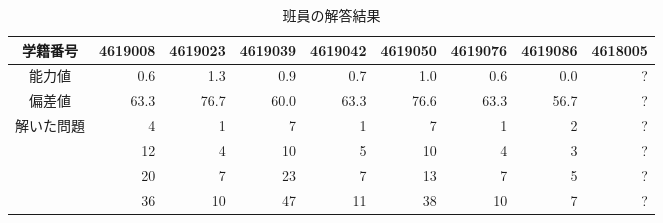 \documentclass[12pt]{jarticle}
\begin{document}
\begin{table}[h]
    \begin{center}
        \centering
        \caption{班員の解答結果}
        \begin{tabular}{|c|r|r|r|r|r|r|r|r|} \hline
            学籍番号                     & \multicolumn{1}{|c|}{4619008} & \multicolumn{1}{|c|}{4619023} & \multicolumn{1}{|c|}{4619039} & \multicolumn{1}{|c|}{4619042} & \multicolumn{1}{|c|}{4619050} & \multicolumn{1}{|c|}{4619076} & \multicolumn{1}{|c|}{4619086} & \multicolumn{1}{|c|}{4618005} \\
            \hline
            能力値                       & 0.6                           & 1.3                           & 0.9                           & 0.7                           & 1.0                           & 0.6                           & 0.0                           & ?                             \\ \hline
            偏差値                       & 63.3                          & 76.7                          & 60.0                          & 63.3                          & 76.6                          & 63.3                          & 56.7                          & ?                             \\ \hline
            \multirow{20}{*}{解いた問題} & 4                             & 1                             & 7                             & 1                             & 7                             & 1                             & 2                             & ?                             \\
                                         & 12                            & 4                             & 10                            & 5                             & 10                            & 4                             & 3                             & ?                             \\
                                         & 20                            & 7                             & 23                            & 7                             & 13                            & 7                             & 5                             & ?                             \\
                                         & 36                            & 10                            & 47                            & 11                            & 38                            & 10                            & 7                             & ?                             \\

\end{tabular}
\end{center}
\end{table}
\end{document}
